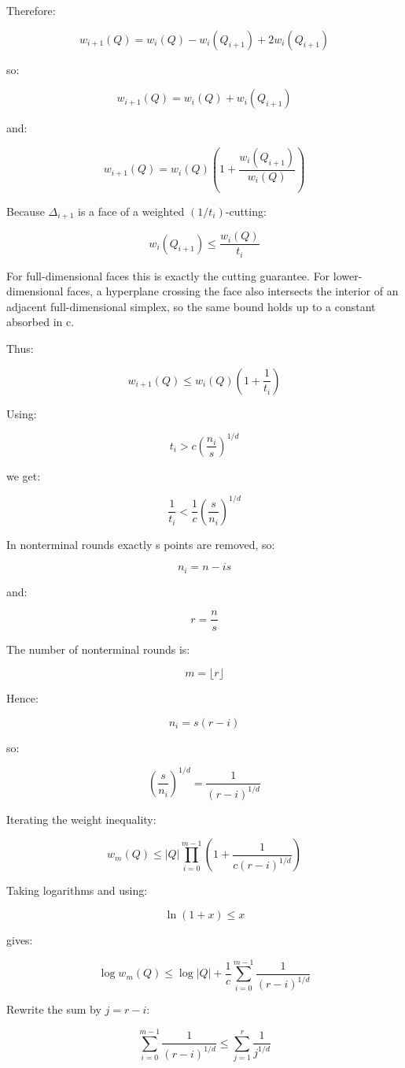 \documentclass[
  11pt,
]{article}
\begin{document}
Therefore:

\[
w_{i+1}(Q) =w_i(Q)-w_i(Q_{i+1})+2w_i(Q_{i+1})
\]

so:

\[
w_{i+1}(Q) =w_i(Q)+w_i(Q_{i+1})
\]

and:

\[
w_{i+1}(Q) =w_i(Q)\left(1+\frac{w_i(Q_{i+1})}{w_i(Q)}\right)
\]

Because \(\Delta_{i+1}\) is a face of a weighted \((1/t_i)\)-cutting:

\[
w_i(Q_{i+1})\le \frac{w_i(Q)}{t_i}
\]

For full-dimensional faces this is exactly the cutting guarantee. For
lower-dimensional faces, a hyperplane crossing the face also intersects
the interior of an adjacent full-dimensional simplex, so the same bound
holds up to a constant absorbed in c.

Thus:

\[
w_{i+1}(Q) \le w_i(Q)\left(1+\frac{1}{t_i}\right)
\]

Using:

\[
t_i>c\left(\frac{n_i}{s}\right)^{1/d}
\]

we get:

\[
\frac{1}{t_i} < \frac{1}{c}\left(\frac{s}{n_i}\right)^{1/d}
\]

In nonterminal rounds exactly s points are removed, so:

\[
n_i=n-is
\]

and:

\[
r=\frac{n}{s}
\]

The number of nonterminal rounds is:

\[
m=\lfloor r\rfloor
\]

Hence:

\[
n_i=s(r-i)
\]

so:

\[
\left(\frac{s}{n_i}\right)^{1/d} = \frac{1}{(r-i)^{1/d}}
\]

Iterating the weight inequality:

\[
w_m(Q) \le |Q|\prod_{i=0}^{m-1}\left(1+\frac{1}{c(r-i)^{1/d}}\right)
\]

Taking logarithms and using:

\[
\ln(1+x)\le x
\]

gives:

\[
\log w_m(Q) \le \log |Q| + \frac{1}{c}\sum_{i=0}^{m-1}\frac{1}{(r-i)^{1/d}}
\]

Rewrite the sum by \(j=r-i\):

\[
\sum_{i=0}^{m-1}\frac{1}{(r-i)^{1/d}} \le \sum_{j=1}^{r}\frac{1}{j^{1/d}}
\]
\end{document}
